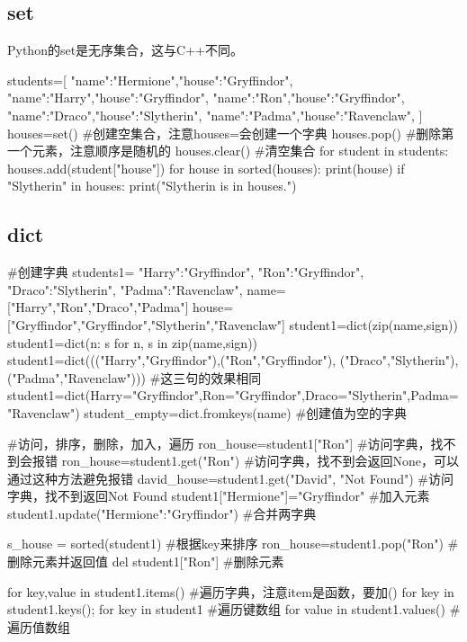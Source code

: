   \subsection{set}
    Python的set是无序集合，这与C++不同。
    \begin{codeblock}[language=python, caption={basic operation of set}]
      students=[
        {"name":"Hermione","house":"Gryffindor"},
        {"name":"Harry","house":"Gryffindor"},
        {"name":"Ron","house":"Gryffindor"},
        {"name":"Draco","house":"Slytherin"},
        {"name":"Padma","house":"Ravenclaw"},
      ]
      houses=set() #创建空集合，注意houses={}会创建一个字典
      houses.pop() #删除第一个元素，注意顺序是随机的
      houses.clear() #清空集合
      for student in students:
        houses.add(student["house"])
      for house in sorted(houses):
        print(house)
      if "Slytherin" in houses:
        print("Slytherin is in houses.")
    \end{codeblock}

  \subsection{dict}
    \begin{codeblock}[language=python, caption={basic operation of dictionary}]
      #创建字典
      students1={
        "Harry":"Gryffindor",
        "Ron":"Gryffindor",
        "Draco":"Slytherin",
        "Padma":"Ravenclaw",
      }
      name=["Harry","Ron","Draco","Padma"]
      house=["Gryffindor","Gryffindor","Slytherin","Ravenclaw"]
      student1=dict(zip(name,sign)) 
      student1=dict(n: s for n, s in zip(name,sign))
      student1=dict((("Harry","Gryffindor"),("Ron","Gryffindor"),
          ("Draco","Slytherin"),("Padma","Ravenclaw"))) #这三句的效果相同
      student1=dict(Harry="Gryffindor",Ron="Gryffindor",Draco="Slytherin",Padma="Ravenclaw")
      student_empty=dict.fromkeys(name) #创建值为空的字典

      #访问，排序，删除，加入，遍历
      ron_house=student1["Ron"] #访问字典，找不到会报错
      ron_house=student1.get("Ron") #访问字典，找不到会返回None，可以通过这种方法避免报错
      david_house=student1.get("David", "Not Found") #访问字典，找不到返回Not Found
      student1["Hermione"]="Gryffindor" #加入元素
      student1.update({"Hermione":"Gryffindor"}) #合并两字典

      s_house = sorted(student1) #根据key来排序
      ron_house=student1.pop("Ron") #删除元素并返回值
      del student1["Ron"] #删除元素

      for key,value in student1.items() #遍历字典，注意item是函数，要加()
      for key in student1.keys(); for key in student1 #遍历键数组
      for value in student1.values() #遍历值数组
    \end{codeblock}

